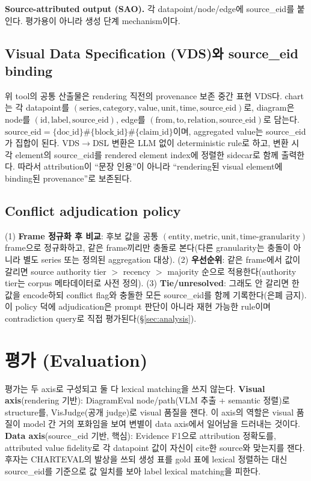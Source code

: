 \documentclass[11pt]{article}
\begin{document}
\textbf{Source-attributed output (SAO).} 각 datapoint/node/edge에 source\_eid를 붙인다. 평가용이
아니라 생성 단계 mechanism이다.

\subsection{Visual Data Specification (VDS)와 source\_eid binding}
\label{sec:vds}

위 tool의 공통 산출물은 rendering 직전의 provenance 보존 중간 표현 VDS다. chart는 각 datapoint를
$(\text{series},\text{category},\text{value},\text{unit},\text{time},\text{source\_eid})$로,
diagram은 node를 $(\text{id},\text{label},\text{source\_eid})$, edge를 $(\text{from},\text{to},
\text{relation},\text{source\_eid})$로 담는다. $\text{source\_eid}=\{\text{doc\_id}\}\#
\{\text{block\_id}\}\#\{\text{claim\_id}\}$이며, aggregated value는 source\_eid가 집합이 된다.
VDS$\rightarrow$DSL 변환은 LLM 없이 deterministic rule로 하고, 변환 시 각 element의 source\_eid를
rendered element index에 정렬한 sidecar로 함께 출력한다. 따라서 attribution이 ``문장 인용''이
아니라 ``rendering된 visual element에 binding된 provenance''로 보존된다.

\subsection{Conflict adjudication policy}
\label{sec:policy}

(1) \textbf{Frame 정규화 후 비교}: 후보 값을 공통 $(\text{entity},\text{metric},\text{unit},
\text{time-granularity})$ frame으로 정규화하고, 같은 frame끼리만 충돌로 본다(다른 granularity는
충돌이 아니라 별도 series 또는 정의된 aggregation 대상). (2) \textbf{우선순위}: 같은 frame에서
값이 갈리면 source authority tier $>$ recency $>$ majority 순으로 적용한다(authority tier는 corpus
메타데이터로 사전 정의). (3) \textbf{Tie/unresolved}: 그래도 안 갈리면 한 값을 encode하되 conflict
flag와 충돌한 모든 source\_eid를 함께 기록한다(은폐 금지). 이 policy 덕에 adjudication은 prompt
판단이 아니라 재현 가능한 rule이며 contradiction query로 직접 평가된다(\S\ref{sec:analysis}).

\section{평가 (Evaluation)}
\label{sec:eval}

평가는 두 axis로 구성되고 둘 다 lexical matching을 쓰지 않는다. \textbf{Visual axis}(rendering
기반): DiagramEval node/path(VLM 추출 + semantic 정렬)로 structure를, VisJudge(공개 judge)로 visual
품질을 잰다. 이 axis의 역할은 visual 품질이 model 간 거의 포화임을 보여 변별이 data axis에서
일어남을 드러내는 것이다. \textbf{Data axis}(source\_eid 기반, 핵심): Evidence F1으로 attribution
정확도를, attributed value fidelity로 각 datapoint 값이 자신이 cite한 source와 맞는지를 잰다.
후자는 CHARTEVAL의 발상을 쓰되 생성 표를 gold 표에 lexical 정렬하는 대신 source\_eid를 기준으로
값 일치를 보아 label lexical matching을 피한다.
\end{document}
